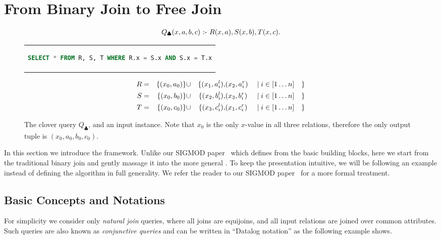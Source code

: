\section{From Binary Join to Free Join}\label{sec:background}

\begin{figure}
  \begin{align*}
    Q_{\clubsuit}(x,a,b,c) \text{ :- } R(x,a),S(x,b),T(x,c).
  \end{align*}
  \begin{center}
    \begin{tabular}{c}
      \begin{lstlisting}[language=SQL, numbers=none]
SELECT * FROM R, S, T WHERE R.x = S.x AND S.x = T.x
\end{lstlisting}
    \end{tabular}
  \end{center}
  \begin{alignat*}{8}
    R & = & \{(x_0, a_0)\} & \cup & \{(x_1, a_i^l), & (x_2, a_i^r) &  & \mid i \in [1 \ldots n] & \} \\
    S & = & \{(x_0, b_0)\} & \cup & \{(x_2, b_i^l), & (x_3, b_i^r) &  & \mid i \in [1 \ldots n] & \} \\
    T & = & \{(x_0, c_0)\} & \cup & \{(x_3, c_i^l), & (x_1, c_i^r) &  & \mid i \in [1 \ldots n] & \}
  \end{alignat*}
  \caption{The clover query $Q_\clubsuit$, and an input instance.
    Note that $x_0$ is the only $x$-value in all three relations,
    therefore the only output tuple is $(x_0, a_0, b_0, c_0)$. }
  \label{fig:clover-query}
\end{figure}

In this section we introduce the \FJ framework.
Unlike our SIGMOD paper~\cite{10.1145/3589295} which defines \FJ from
the basic building blocks,
here we start from the traditional binary join
and gently massage it into the more general \FJ.
To keep the presentation intuitive,
we will be following an example instead of
defining the algorithm in full generality.
We refer the reader to our SIGMOD paper~\cite{10.1145/3589295}
for a more formal treatment.

\subsection{Basic Concepts and Notations}\label{sec:basic-concepts}

For simplicity we consider only {\em natural join} queries,
where all joins are equijoins, and all input relations
are joined over common attributes.
Such queries are also known as {\em conjunctive queries}
and can be written in ``Datalog notation'' as the following
example shows.

